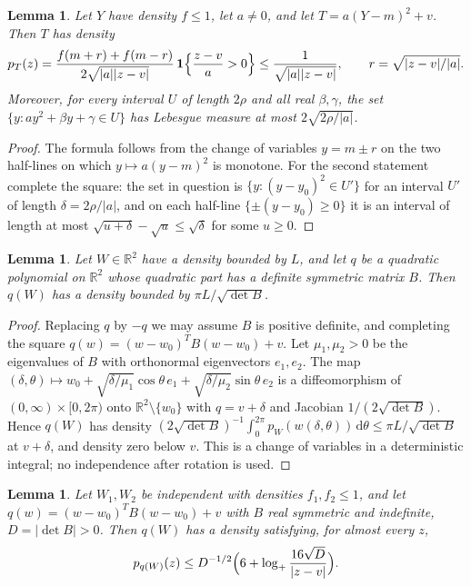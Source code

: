 \documentclass[11pt]{amsart}
\numberwithin{equation}{section}
\newtheorem{lemma}[theorem]{Lemma}
\theoremstyle{definition}
\theoremstyle{remark}
\newcommand{\R}{\mathbb R}
\newcommand{\1}{\mathbf 1}
\newcommand{\dd}{\,\mathrm d}
\newcommand{\logp}{\log_+}
\newcommand{\abs}[1]{\lvert #1\rvert}
\begin{document}
\begin{lemma}\label{lem:square}
Let $Y$ have density $f\le1$, let $a\ne0$, and let $T=a(Y-m)^2+v$. Then $T$ has density
\[
p_T(z)=\frac{f(m+r)+f(m-r)}{2\sqrt{\abs a\abs{z-v}}}\,\1\Bigl\{\frac{z-v}{a}>0\Bigr\}\le\frac1{\sqrt{\abs a\abs{z-v}}},\qquad r=\sqrt{\abs{z-v}/\abs a}.
\]
Moreover, for every interval $U$ of length $2\rho$ and all real $\beta,\gamma$, the set $\{y:ay^2+\beta y+\gamma\in U\}$ has Lebesgue measure at most $2\sqrt{2\rho/\abs a}$.
\end{lemma}

\begin{proof}
The formula follows from the change of variables $y=m\pm r$ on the two half-lines on which $y\mapsto a(y-m)^2$ is monotone. For the second statement complete the square: the set in question is $\{y:(y-y_0)^2\in U'\}$ for an interval $U'$ of length $\delta=2\rho/\abs a$, and on each half-line $\{\pm(y-y_0)\ge0\}$ it is an interval of length at most $\sqrt{u+\delta}-\sqrt u\le\sqrt\delta$ for some $u\ge0$.
\end{proof}

\begin{lemma}\label{lem:definite}
Let $W\in\R^2$ have a density bounded by $L$, and let $q$ be a quadratic polynomial on $\R^2$ whose quadratic part has a definite symmetric matrix $B$. Then $q(W)$ has a density bounded by $\pi L/\sqrt{\det B}$.
\end{lemma}

\begin{proof}
Replacing $q$ by $-q$ we may assume $B$ is positive definite, and completing the square $q(w)=(w-w_0)^TB(w-w_0)+v$. Let $\mu_1,\mu_2>0$ be the eigenvalues of $B$ with orthonormal eigenvectors $e_1,e_2$. The map $(\delta,\theta)\mapsto w_0+\sqrt{\delta/\mu_1}\cos\theta\,e_1+\sqrt{\delta/\mu_2}\sin\theta\,e_2$ is a diffeomorphism of $(0,\infty)\times[0,2\pi)$ onto $\R^2\setminus\{w_0\}$ with $q=v+\delta$ and Jacobian $1/(2\sqrt{\det B})$. Hence $q(W)$ has density $(2\sqrt{\det B})^{-1}\int_0^{2\pi}p_W(w(\delta,\theta))\dd\theta\le\pi L/\sqrt{\det B}$ at $v+\delta$, and density zero below $v$. This is a change of variables in a deterministic integral; no independence after rotation is used.
\end{proof}

\begin{lemma}\label{lem:hyperbola}
Let $W_1,W_2$ be independent with densities $f_1,f_2\le1$, and let $q(w)=(w-w_0)^TB(w-w_0)+v$ with $B$ real symmetric and indefinite, $D=\abs{\det B}>0$. Then $q(W)$ has a density satisfying, for almost every $z$,
\begin{equation}\label{eq:hyperbola}
p_{q(W)}(z)\le D^{-1/2}\Bigl(6+\logp\frac{16\sqrt D}{\abs{z-v}}\Bigr).
\end{equation}
\end{lemma}
\end{document}
